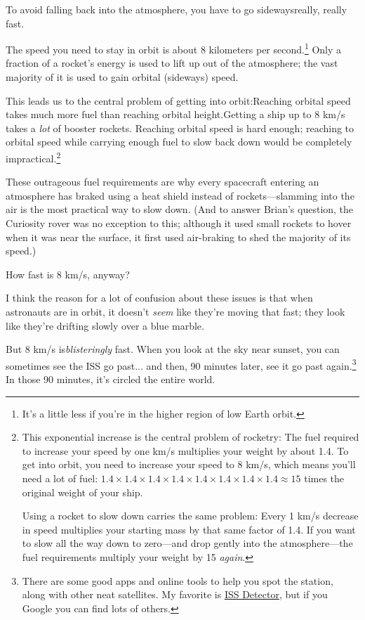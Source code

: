 {{To avoid falling back into the atmosphere, you have to go sidewaysreally, really fast.}

{The speed you need to stay in orbit is about 8 kilometers per second.{\footnote{It's a little less if you're in the higher region of low Earth orbit.} } Only a fraction of a rocket's energy is used to lift up out of the atmosphere; the vast majority of it is used to gain orbital (sideways) speed.}

{This leads us to the central problem of getting into orbit:Reaching orbital speed takes much more fuel than reaching orbital height.Getting a ship up to 8 km/s takes a \emph{lot} of booster rockets. Reaching orbital speed is hard enough; reaching to orbital speed while carrying enough fuel to slow back down would be completely impractical.{\footnote{This exponential increase is the central problem of rocketry: The fuel required to increase your speed by one km/s multiplies your weight by about 1.4. To get into orbit, you need to increase your speed to 8 km/s, which means you'll need a lot of fuel: $ 1.4\times1.4\times1.4\times1.4\times1.4\times1.4\times1.4\times1.4\approx 15$ times the original weight of your ship.

Using a rocket to slow down carries the same problem: Every 1 km/s decrease in speed multiplies your starting mass by that same factor of 1.4. If you want to slow all the way down to zero—and drop gently into the atmosphere—the fuel requirements multiply your weight by 15 \emph{again}.} } }

{These outrageous fuel requirements are why every spacecraft entering an atmosphere has braked using a heat shield instead of rockets—slamming into the air is the most practical way to slow down. (And to answer Brian's question, the Curiosity rover was no exception to this; although it used small rockets to hover when it was near the surface, it first used air-braking to shed the majority of its speed.)}

{How fast is 8 km/s, anyway?}

{I think the reason for a lot of confusion about these issues is that when astronauts are in orbit, it doesn't \emph{seem} like they're moving that fast; they look like they're drifting slowly over a blue marble.}

{But 8 km/s is\emph{blisteringly} fast. When you look at the sky near sunset, you can sometimes see the ISS go past... and then, 90 minutes later, see it go past again.{\footnote{There are some good apps and online tools to help you spot the station, along with other neat satellites. My favorite is \href{https://play.google.com/store/apps/details?id=com.runar.issdetector}{ISS Detector}, but if you Google you can find lots of others.} } In those 90 minutes, it's circled the entire world.}

}
